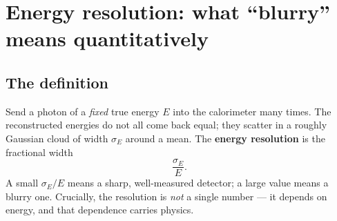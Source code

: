 \documentclass[11pt]{article}
\begin{document}
\section{Energy resolution: what ``blurry'' means quantitatively}

\subsection{The definition}
Send a photon of a \emph{fixed} true energy $E$ into the calorimeter many times.
The reconstructed energies do not all come back equal; they scatter in a roughly
Gaussian cloud of width $\sigma_E$ around a mean. The \textbf{energy resolution}
is the fractional width
\begin{equation}
  \frac{\sigma_E}{E}.
\end{equation}
A small $\sigma_E/E$ means a sharp, well-measured detector; a large value means a
blurry one. Crucially, the resolution is \emph{not} a single number --- it
depends on energy, and that dependence carries physics.
\end{document}

